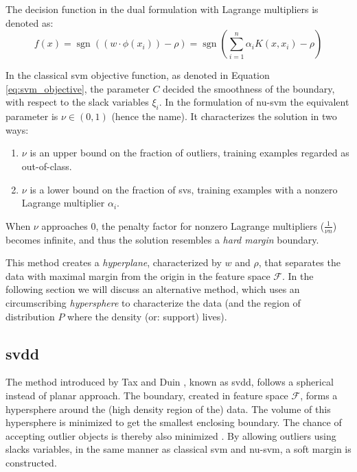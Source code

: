 The decision function in the dual formulation with Lagrange multipliers is denoted as:
\begin{equation}\label{eq:nu-svm_lagrange}
f(x) = \operatorname{sgn}((w \cdot \phi(x_i)) - \rho) = \operatorname{sgn}( \sum_{i=1}^n \alpha_i K(x, x_i) - \rho)
\end{equation}

In the classical \gls{svm} objective function, as denoted in Equation \ref{eq:svm_objective}, the parameter $C$ decided the smoothness of the boundary, with respect to the slack variables $\xi_i$.
In the formulation of \gls{nu-svm} the equivalent parameter is $\nu \in (0,1)$ (hence the name).
It characterizes the solution in two ways:
\begin{enumerate}
  \item $\nu$ is an upper bound on the fraction of outliers, \ie training examples regarded as out-of-class.
  \item $\nu$ is a lower bound on the fraction of \glspl{sv}, \ie training examples with a nonzero Lagrange multiplier $\alpha_i$.
\end{enumerate}
When $\nu$ approaches $0$, the penalty factor for nonzero Lagrange multipliers ($\frac{1}{\nu n}$) becomes infinite, and thus the solution resembles a \emph{hard margin} boundary.

This method creates a \emph{hyperplane}, characterized by $w$ and $\rho$, that separates the data with maximal margin from the origin in the feature space $\mathcal{F}$.
In the following section we will discuss an alternative method, which uses an circumscribing \emph{hypersphere} to characterize the data (and the region of distribution $P$ where the density (or: support) lives).



\subsection{\acrlong{svdd}}\label{subsec:oc-svm-svdd}
The method introduced by Tax and Duin \cite{tax1999support}, known as \acrlong{svdd}, follows a spherical instead of planar approach.
The boundary, created in feature space $\mathcal{F}$, forms a hypersphere around the (high density region of the) data.
The volume of this hypersphere is minimized to get the smallest enclosing boundary.
The chance of accepting outlier objects is thereby also minimized \cite{tax2003online}.
By allowing outliers using slacks variables, in the same manner as classical \gls{svm} and \gls{nu-svm}, a soft margin is constructed.

